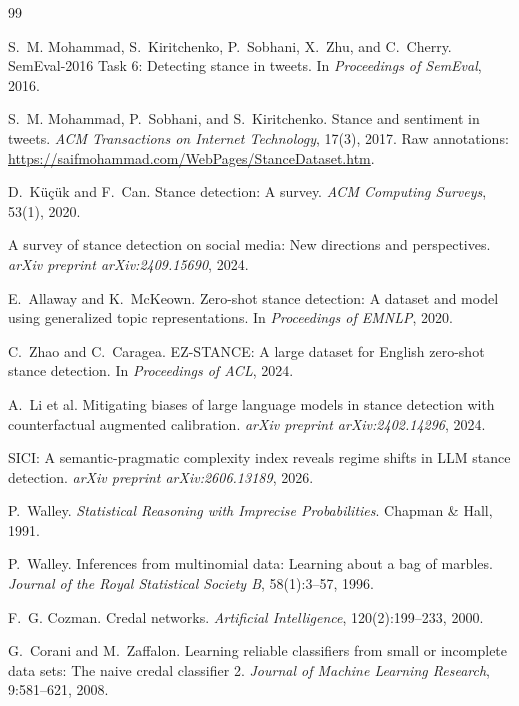 \documentclass[11pt,a4paper]{article}
\begin{document}
\begin{thebibliography}{99}
\small

S.~M. Mohammad, S.~Kiritchenko, P.~Sobhani, X.~Zhu, and C.~Cherry.
\newblock SemEval-2016 Task 6: Detecting stance in tweets.
\newblock In \emph{Proceedings of SemEval}, 2016.

S.~M. Mohammad, P.~Sobhani, and S.~Kiritchenko.
\newblock Stance and sentiment in tweets.
\newblock \emph{ACM Transactions on Internet Technology}, 17(3), 2017.
\newblock Raw annotations: \url{https://saifmohammad.com/WebPages/StanceDataset.htm}.

D.~K{\"u}{\c{c}}{\"u}k and F.~Can.
\newblock Stance detection: A survey.
\newblock \emph{ACM Computing Surveys}, 53(1), 2020.

A survey of stance detection on social media: New directions and perspectives.
\newblock \emph{arXiv preprint arXiv:2409.15690}, 2024.

E.~Allaway and K.~McKeown.
\newblock Zero-shot stance detection: A dataset and model using generalized topic representations.
\newblock In \emph{Proceedings of EMNLP}, 2020.

C.~Zhao and C.~Caragea.
\newblock EZ-STANCE: A large dataset for English zero-shot stance detection.
\newblock In \emph{Proceedings of ACL}, 2024.

A.~Li et al.
\newblock Mitigating biases of large language models in stance detection with counterfactual augmented calibration.
\newblock \emph{arXiv preprint arXiv:2402.14296}, 2024.

SICI: A semantic-pragmatic complexity index reveals regime shifts in LLM stance detection.
\newblock \emph{arXiv preprint arXiv:2606.13189}, 2026.

P.~Walley.
\newblock \emph{Statistical Reasoning with Imprecise Probabilities}.
\newblock Chapman \& Hall, 1991.

P.~Walley.
\newblock Inferences from multinomial data: Learning about a bag of marbles.
\newblock \emph{Journal of the Royal Statistical Society B}, 58(1):3--57, 1996.

F.~G. Cozman.
\newblock Credal networks.
\newblock \emph{Artificial Intelligence}, 120(2):199--233, 2000.

G.~Corani and M.~Zaffalon.
\newblock Learning reliable classifiers from small or incomplete data sets: The naive credal classifier 2.
\newblock \emph{Journal of Machine Learning Research}, 9:581--621, 2008.


\end{thebibliography}
\end{document}
